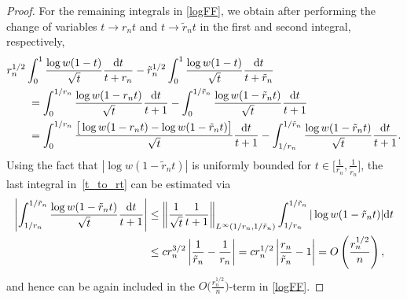 \begin{proof}
For the remaining integrals in \eqref{logFF}, we obtain after performing the change of variables $t \to r_n t$ and $t \to \tilde r_n t$ in the first and second integral, respectively,
\begin{align}\nonumber
 &r_n^{1/2}\int_0^1 \frac{\log w(1-t)}{\sqrt{t}} \frac{{\rm d}t}{t+r_n} - \tilde r_n^{1/2} \int_0^1 \frac{\log w(1-t)}{\sqrt{t}} \frac{{\rm d}t}{t+\tilde r_n}
 \\
 &\qquad= \int_0^{1/r_n} \frac{\log w(1-r_n t)}{\sqrt{t}} \frac{{\rm d}t}{t+1} - \int_0^{1/\tilde r_n} \frac{\log w(1-\tilde r_n t)}{\sqrt{t}} \frac{{\rm d}t}{t+1}\nonumber
 \\
&\qquad = \int_0^{1/r_n}\frac{\big[\log w(1-r_n t) - \log w(1-\tilde r_n t)\big]}{\sqrt{t}} \frac{{\rm d}t}{t+1}-\int_{1/ r_n}^{1/\tilde r_n} \frac{\log w(1-\tilde r_n t)}{\sqrt{t}} \frac{{\rm d}t}{t+1}.\label{t_to_rt}
\end{align}
Using the fact that $|\log w(1-\tilde r_n t)|$ is uniformly bounded for $t \in \big[\frac{1}{r_n}, \frac{1}{\tilde r_n}\big]$, the last integral in~\eqref{t_to_rt} can be estimated via
\begin{align*}
 \left| \int_{1/r_n}^{1/\tilde r_n} \frac{\log w(1-\tilde r_n t)}{\sqrt{t}} \frac{{\rm d}t}{t+1} \right| &\leq \left \Vert \frac{1}{\sqrt{t}} \frac{1}{t+1} \right \Vert_{L^\infty(1/r_n, 1/\tilde r_n)} \int_{1/ r_n}^{1/\tilde r_n} |\log w(1-\tilde r_n t)| {\rm d}t \\
 &\leq c r_n^{3/2} \left| \frac{1}{\tilde r_n} - \frac{1}{r_n}\right| = c r_n^{1/2} \left| \frac{r_n}{\tilde r_n}-1\right| = O\left(\frac{r_n^{1/2}}{n}\right),
\end{align*}
and hence can be again included in the $O\big(\frac{r_n^{1/2}}{ n}\big)$-term in \eqref{logFF}.


\end{proof}
